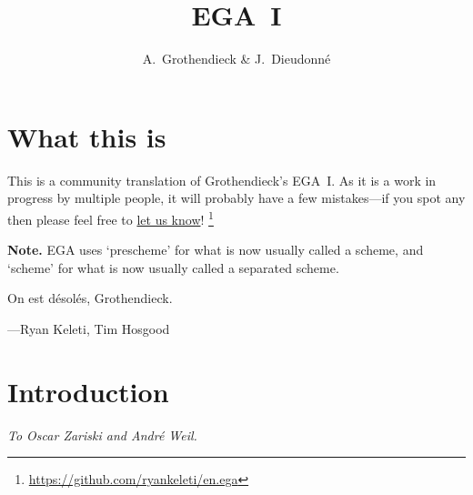 \documentclass[10pt,oneside]{book}
\begin{document}
\title{EGA~I}
\author{A.~Grothendieck \& J.~Dieudonn\'e}
\maketitle
\frontmatter
\chapter*{What this is}
    This is a community translation of Grothendieck's EGA~I.
    As it is a work in progress by multiple people, it will probably have a few
    mistakes---if you spot any then please feel free to
    \href{https://github.com/ryankeleti/en.ega/issues}{let us know}!
    \thanks{\url{https://github.com/ryankeleti/en.ega}}

\noindent
    \textbf{Note.} EGA uses `prescheme' for what is now usually called
    a scheme, and `scheme' for what is now usually called a
    separated scheme.
 
    On est d\'esol\'es, Grothendieck.

    ---Ryan Keleti, Tim Hosgood


{
  \tableofcontents{}
}

\clearpage
\mainmatter

\chapter*{Introduction}
\label{intro-section}

\begin{flushright}
\emph{To Oscar Zariski and Andr\'e Weil.}
\end{flushright}
\medskip
\end{document}
